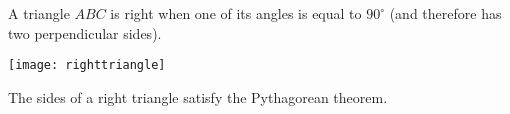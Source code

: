 \documentclass[12pt]{article}
\begin{document}
A triangle $ABC$ is right when one of its angles is equal to $90^\circ$ (and therefore has two perpendicular sides).

\begin{center}
\texttt{[image: righttriangle]}
\end{center}

The sides of a right triangle satisfy the Pythagorean theorem.

\end{document}
